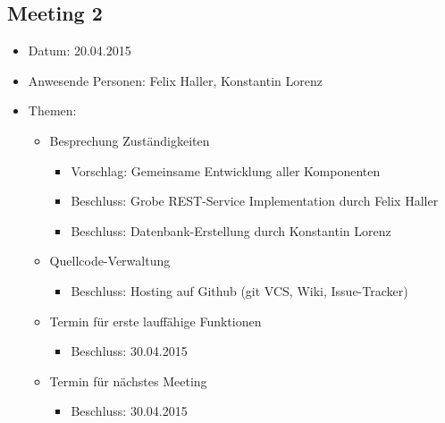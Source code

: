 \documentclass[12pt]{scrartcl}
\begin{document}
		\subsection{Meeting 2}
		\begin{itemize}
			\item Datum: 20.04.2015
			\item Anwesende Personen: Felix Haller, Konstantin Lorenz
			\item Themen:
			\begin{itemize}
				\item Besprechung Zuständigkeiten
				\begin{itemize}
					\item Vorschlag: Gemeinsame Entwicklung aller Komponenten
					\item Beschluss: Grobe REST-Service Implementation durch Felix Haller
					\item Beschluss: Datenbank-Erstellung durch Konstantin Lorenz
				\end{itemize}
				\item Quellcode-Verwaltung
				\begin{itemize}
					\item Beschluss: Hosting auf Github (git VCS, Wiki, Issue-Tracker)
				\end{itemize}
				\item Termin für erste lauffähige Funktionen
				\begin{itemize}
					\item Beschluss: 30.04.2015
				\end{itemize}
				\item Termin für nächstes Meeting
				\begin{itemize}
					\item Beschluss: 30.04.2015
				\end{itemize}
			\end{itemize}
		\end{itemize}
		
\end{document}
